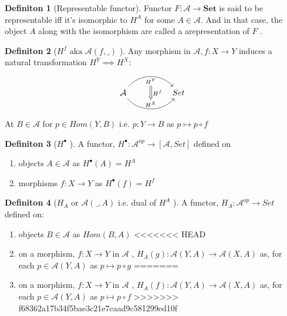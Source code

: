 \documentclass{article}
\theoremstyle{definition}
\theoremstyle{definition}
\newtheorem{definition}{Definiton}[section]
\theoremstyle{definition}
\theoremstyle{definition}
\begin{document}
\begin{definition}[Representable functor] %
	Functor $F:\mathcal{A} \rightarrow \textbf{Set}$ is said to be representable iff it's isomorphic to
	$H^A$ for some $A \in \mathcal{A} $. And in that case, the object $A$ along with the isomorphism
	are called a arepresentation of $F$ .
\end{definition}

\begin{definition}[$H^f \text{ aka } \mathcal{A} (f, \_)$ ] %
	Any morphism in $\mathcal{A}, f:X \rightarrow Y	$ induces a natural transformation $H^Y \implies H^X $:
	\[ 	\begin{tikzcd}[row sep=large, column sep=huge]
	\mathcal{ \mathcal{A} } \arrow[r,bend left=50, "H^Y"{name=U, below}]
	\arrow[r, bend right = 50, "H^X"{name=D, above}]
	& Set \arrow[Rightarrow, from=U , to=D, "H^f"]
		\end{tikzcd} \]
		At $B \in \mathcal{A} $ for $p \in Hom (Y,B) \text{ i.e. } p:Y \rightarrow B $ as
		$p \mapsto p \circ f$
\end{definition}

\begin{definition}[$H^\bullet$ ] %
	A functor, $H^\bullet : \mathcal{A} ^{op} \rightarrow [ \mathcal{A} , Set ] $ defined on
	\begin{enumerate}[label=\roman*]
		\item objects $A \in \mathcal{A} $ as $H^\bullet (A) = H^A$
		\item morphisms $f:X\rightarrow Y$ as $H^\bullet(f)=H^f$
	\end{enumerate}
\end{definition}

\begin{definition}[$H_A$ or $\mathcal{A} (\_,A)$  i.e. dual of $H^A$ ] %
	A functor, $H_A: \mathcal{A} ^{op} \rightarrow Set$ defined on:
	\begin{enumerate}[label=\roman*]
		\item objects $B \in \mathcal{A} $ as $Hom(B,A)$
<<<<<<< HEAD
		\item on a morphism, $f : X \rightarrow Y $ in $\mathcal{A}$ ,
			$H_A(g): \mathcal{A} (Y,A) \rightarrow \mathcal{A}(X,A) $
			as, for each $p \in \mathcal{A}(Y,A) $ as $p \mapsto p \circ g$
=======
		\item on a morphism, $f : X \rightarrow Y $ in $\mathcal{A}$ , $H_A(f): \mathcal{A} (Y,A) \rightarrow \mathcal{A}(X,A) $ as, for each $p \in \mathcal{A}(Y,A) $ as $p \mapsto p \circ f$
>>>>>>> f68362a17b34f5bae3c21e7caad9c581299ed10f
	\end{enumerate}
\end{definition}
\end{document}
